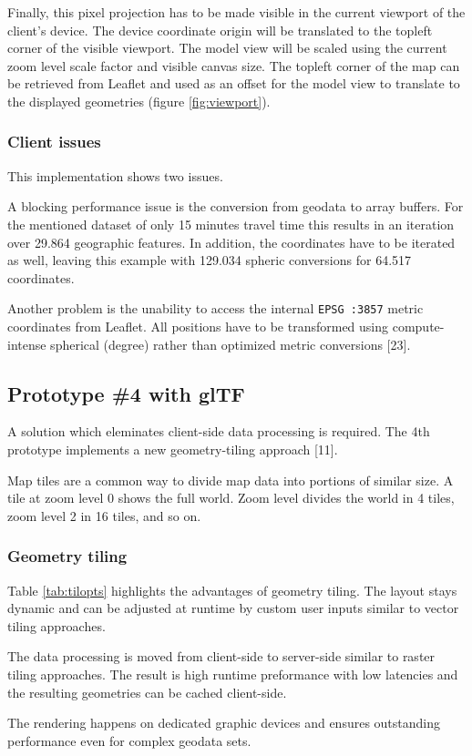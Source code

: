 \documentclass{motivation}
\begin{document}
  Finally, this pixel projection has to be made visible in the current viewport of the client's device. The device coordinate origin will be translated to the topleft corner of the visible viewport. The model view will be scaled using the current zoom level scale factor and visible canvas size.  The topleft corner of the map can be retrieved from Leaflet and used as an offset for the model view to translate to the displayed geometries (figure \ref{fig:viewport}).

\subsubsection{Client issues}
  \label{sec:issue}
  This implementation shows two issues.\par
  A blocking performance issue is the conversion from geodata to array buffers. For the mentioned dataset of only 15 minutes travel time this results in an iteration over 29.864 geographic features. In addition, the coordinates have to be iterated as well, leaving this example with 129.034 spheric conversions for 64.517 coordinates.\par
  Another problem is the unability to access the internal \texttt{EPSG :3857} metric coordinates from Leaflet. All positions have to be transformed using compute-intense spherical (degree) rather than optimized metric conversions [23].

\subsection{Prototype \#4 with glTF}
  \label{sec:pt4}
  A solution which eleminates client-side data processing is required. The 4th prototype implements a new geometry-tiling approach [11].\par
  Map tiles are a common way to divide map data into portions of similar size. A tile at zoom level 0 shows the full world. Zoom level divides the world in 4 tiles, zoom level 2 in 16 tiles, and so on.

\subsubsection{Geometry tiling}
   Table \ref{tab:tilopts} highlights the advantages of geometry tiling. The layout stays dynamic and can be adjusted at runtime by custom user inputs similar to vector tiling approaches.\par
   The data processing is moved from client-side to server-side similar to raster tiling approaches. The result is high runtime preformance with low latencies and the resulting geometries can be cached client-side.\par
   The rendering happens on dedicated graphic devices and ensures outstanding performance even for complex geodata sets.
\end{document}

